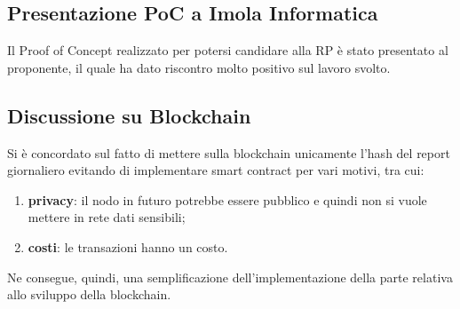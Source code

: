 \subsection*{Presentazione PoC a Imola Informatica}
Il Proof of Concept realizzato per potersi candidare alla RP è stato presentato al proponente, il quale ha dato riscontro molto positivo sul lavoro svolto.

\subsection*{Discussione su Blockchain}
Si è concordato sul fatto di mettere sulla blockchain unicamente l'hash del report giornaliero evitando di implementare smart contract per vari motivi, tra cui:
\begin{enumerate}
	\item \textbf{privacy}: il nodo in futuro potrebbe essere pubblico e quindi non si vuole mettere in rete dati sensibili;
	\item \textbf{costi}: le transazioni hanno un costo.
\end{enumerate}
Ne consegue, quindi, una semplificazione dell'implementazione della parte relativa allo sviluppo della blockchain.






